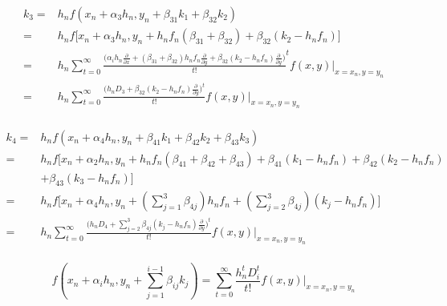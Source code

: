 \documentclass[12 pt]{article}
\begin{document}
{
	\large
	\begin{equation}
		\begin{split}
k_{3} = & h_{n}f(x_{n}+\alpha_{3}h_{n},y_{n}+\beta_{31}k_{1}+\beta_{32}k_{2})\\
	  =	& h_{n}f\bigg[x_{n}+\alpha_{3}h_{n},y_{n}+h_{n}f_{n}(\beta_{31}+\beta_{32})+\beta_{32}(k_{2}-h_{n}f_{n})\bigg]\\
	  = & h_{n}\sum_{t=0}^{\infty}\frac{\bigg(\alpha_{i}h_{n}\frac{\partial}{\partial x} + (\beta_{31}+\beta_{32})h_{n}f_{n}\frac{\partial}{\partial y} + \beta_{32}(k_{2}-h_{n}f_{n})\frac{\partial}{\partial y}\bigg)}{t!}^{t}f(x,y)\big\vert_{x = x_{n}, y= y_{n}}\\
	  =&h_{n}\sum_{t=0}^{\infty}\frac{\bigg(h_{n}D_{3}+\beta_{32}(k_{2}-h_{n}f_{n})\frac{\partial}{\partial y}\bigg)^{t}}{t!}f(x,y)\big\vert_{x = x_{n}, y= y_{n}}\\ 
\end{split}
\end{equation}
}


	  
{
\begin{equation}
\begin{split}	  	  
k_{4} =& h_{n}f(x_{n}+\alpha_{4}h_{n},y_{n}+\beta_{41}k_{1}+\beta_{42}k_{2}+\beta_{43}k_{3})\\
	  =& h_{n}f\bigg[x_{n}+\alpha_{2}h_{n},y_{n}+h_{n}f_{n}(\beta_{41}+\beta_{42}+\beta_{43})+\beta_{41}(k_{1}-h_{n}f_{n})+\beta_{42}(k_{2}-h_{n}f_{n})\\
	  	  & +\beta_{43}(k_{3}-h_{n}f_{n})\bigg]\\
	  =& h_{n}f\bigg[x_{n}+\alpha_{4}h_{n}, y_{n}+(\sum_{j=1}^{3}\beta_{4j})h_{n}f_{n} + (\sum_{j=2}^{3}\beta_{4j})(k_{j}-h_{n}f_{n})\bigg]\\
	  =& h_{n}\sum_{t=0}^{\infty}\frac{\bigg(h_{n}D_{4}+\sum_{j=2}^{3}\beta_{4j}(k_{j}-h_{n}f_{n})\frac{\partial}{\partial y}\bigg)^{t}}{t!}f(x,y)\big\vert_{x = x_{n}, y= y_{n}}\\
\end{split}
\end{equation}
}

{
	\large
	$$f(x_{n}+\alpha_{i}h_{n}, y_{n}+\sum_{j=1}^{i-1}\beta_{ij}k_{j}) = \sum_{t=0}^{\infty}\frac{h_{n}^{t}D^{t}_{i}}{t!}f(x,y)\big\vert_{x = x_{n}, y= y_{n}}$$
}
\end{document}
